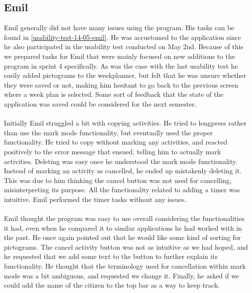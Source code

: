 \subsection{Emil}
Emil generally did not have many issues using the program. 
His tasks can be found in \autoref{usability-test-14-05-emil}.
He was accustomed to the application since he also participated in the usability test conducted on May 2nd. 
Because of this we prepared tasks for Emil that were mainly focused on new additions to the program in sprint 4 specifically.
As was the case with the last usability test he easily added pictograms to the weekplanner, but felt that he was unsure whether they were saved or not, making him hesitant to go back to the previous screen where a week plan is selected. 
Some sort of feedback that the state of the application was saved could be considered for the next semester.
\\\\
Initially Emil struggled a bit with copying activities.
He tried to longpress rather than use the mark mode functionality, but eventually used the proper functionality.
He tried to copy without marking any activities, and reacted positively to the error message that ensued, telling him to actually mark activities.
Deleting was easy once he understood the mark mode functionality.
Instead of marking an activity as cancelled, he ended up mistakenly deleting it.
This was due to him thinking the cancel button was not used for cancelling, misinterpreting its purpose.
All the functionality related to adding a timer was intuitive. 
Emil performed the timer tasks without any issues.
\\\\
Emil thought the program was easy to use overall considering the functionalities it had, even when he compared it to similar applications he had worked with in the past.
He once again pointed out that he would like some kind of sorting for pictograms.
The cancel activity button was not as intuitive as we had hoped, and he requested that we add some text to the button to further explain its functionality.
He thought that the terminology used for cancellation within mark mode was a bit ambiguous, and requested we change it.
Finally, he asked if we could add the name of the citizen to the top bar as a way to keep track.

